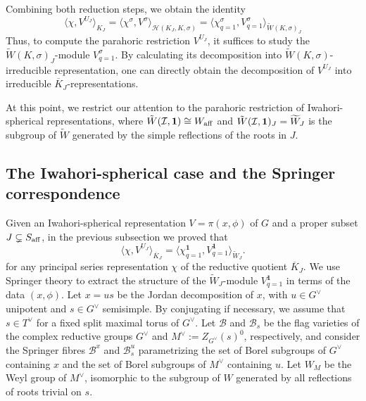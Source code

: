 Combining both reduction steps, we obtain the identity
\begin{equation}\label{eqn:reduction_steps}
    \langle\chi,V^{U_J}\rangle_{K_J}=\langle\chi^\sigma,V^\sigma\rangle_{\mathcal{H}(K_J,K,\sigma)}=\langle\chi^\sigma_{q=1},V^\sigma_{q=1}\rangle_{\tilde{W}(K,\sigma)_J}
\end{equation}
Thus, to compute the parahoric restriction $V^{U_J}$, it suffices to study the $\tilde{W}(K,\sigma)_J$-module $V_{q=1}^\sigma$. By calculating its decomposition into $\tilde{W}(K,\sigma)$-irreducible representation, one can directly obtain the decomposition of $V^{U_J}$ into irreducible $\overline{K}_J$-representations. 

At this point, we restrict our attention to the parahoric restriction of Iwahori-spherical representations, where $\tilde{W}(\mathcal{I},\mathbf{1})\cong W_{\mathrm{aff}}$ and $\tilde{W}(\mathcal{I},\mathbf{1})_J=\widetilde{W}_J$ is the subgroup of $\widetilde{W}$ generated by the simple reflections of the roots in $J$. 

\subsection{The Iwahori-spherical case and the Springer correspondence}\label{subsec:Iwahori_spherical}

Given an Iwahori-spherical representation $V=\pi(x,\phi)$ of $G$ and a proper subset $J\subsetneq S_{\mathrm{aff}}$, in the previous subsection we proved that  
\begin{equation}\label{eqn:multiplicity_Iwahori}
    \langle\chi,V^{U_J}\rangle_{\overline{K}_J}=\langle\chi^\mathbf{1}_{q=1},V^\mathbf{1}_{q=1}\rangle_{\widetilde{W}_J}.
\end{equation}
for any principal series representation $\chi$ of the reductive quotient $\overline{K}_J$. We use Springer theory to extract the structure of the $\widetilde{W}_J$-module $V^\mathbf{1}_{q=1}$ in terms of the data $(x,\phi)$. Let $x=us$ be the Jordan decomposition of $x$, with $u\in G^\vee$ unipotent and $s\in G^\vee$ semisimple. By conjugating if necessary, we assume that $s\in T^\vee$ for a fixed split maximal torus of $G^\vee$. Let $\mathcal{B}$ and $\mathcal{B}_s$ be the flag varieties of the complex reductive groups $G^\vee$ and $M^\vee:=Z_{G^\vee}(s)^0$, respectively, and consider the Springer fibres $\mathcal{B}^x$ and $\mathcal{B}_s^u$ parametrizing the set of Borel subgroups of $G^\vee$ containing $x$ and the set of Borel subgroups of $M^\vee$ containing $u$. Let $W_M$ be the Weyl group of $M^\vee$, isomorphic to the subgroup of $W$ generated by all reflections of roots trivial on $s$.

